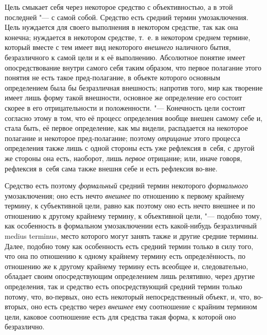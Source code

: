 Цель смыкает себя через некоторое средство с объективностью,
а в этой последней "--- с самой собой. Средство есть средний
термин умозаключения. Цель нуждается для своего выполнения в некотором
средстве, так как она конечна; нуждается в некотором средстве, т.~е. в
некотором среднем термине, который вместе с тем имеет вид некоторого
{\em внешнего} наличного
бытия, безразличного к самой цели и к её выполнению. Абсолютное понятие
имеет опосредствование внутри самого себя таким образом, что первое
полагание этого понятия не есть такое пред-полагание, в объекте
которого основным определением была бы безразличная внешность; напротив
того, мир как творение имеет лишь форму такой внешности, основное же
определение его состоит скорее в его отрицательности и положенности. "---
Конечность цели состоит согласно этому в том, что её процесс
определения вообще внешен самому себе и, стала быть, её первое определение,
как мы видели, распадается на некоторое полагание и некоторое
пред-полагание; поэтому {\em отрицание}
этого процесса определения также лишь с одной стороны есть
уже рефлексия в~себя, с другой же стороны она есть, наоборот, лишь
{\em первое} отрицание; или, иначе говоря, рефлексия в~себя сама также внешня
себе и есть рефлексия во-вне.

Средство есть поэтому {\em формальный} средний термин некоторого
{\em формального} умозаключения; оно есть нечто {\em внешнее} по
отношению к первому крайнему термину, к субъективной цели, равно как
поэтому оно есть нечто внешнее и по отношению к другому крайнему термину, к
объективной цели, "--- подобно тому, как особенность в
формальном умозаключении есть какой-нибудь безразличный medius terminus,
место которого могут занять также и другие средние термины.
Далее, подобно тому как особенность есть средний термин только в силу того,
что она по отношению к одному крайнему термину есть определённость, по
отношению же к другому крайнему термину есть всеобщее и, следовательно,
обладает своим опосредствующим определением лишь релятивно, через другие
определения, так и средство есть опосредствующий средний
термин только потому, что, во-первых, оно есть некоторый непосредственный
объект, и, что, во-вторых, оно есть средство через {\em внешнее} ему
соотношение с крайним термином цели, каковое соотношение есть для средства
такая форма, к которой оно безразлично.

